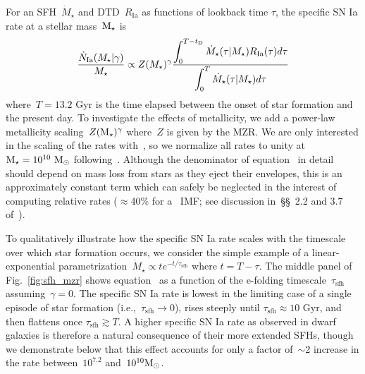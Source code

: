 \documentclass[foo.tex]{subfiles}
\begin{document}
For an SFH~$\dot{M}_\star$ and DTD~$R_\text{Ia}$ as functions of lookback time
$\tau$, the specific SN Ia rate at a stellar mass~$\text{M}_\star$ is
\begin{equation}
\frac{\dot{N}_\text{Ia}(M_\star | \gamma)}{M_\star} \propto Z(M_\star)^\gamma
\frac{\displaystyle{
	\int_0^{T - t_\text{D}}\dot{M}_\star(\tau | M_\star) R_\text{Ia}(\tau) d\tau
}}{\displaystyle{
	\int_0^T \dot{M}_\star(\tau | M_\star) d\tau
}}
\label{eq:specia}
\end{equation}
where~$T = 13.2$ Gyr is the time elapsed between the onset of star formation
and the present day.
To investigate the effects of metallicity, we add a power-law metallicity
scaling~$Z(\text{M}_\star)^\gamma$ where~$Z$ is given by the MZR.
We are only interested in the scaling of the rates with~\mstar, so we normalize
all rates to unity at~$\text{M}_\star = 10^{10}~\text{M}_\odot$ following~\citet{Brown2019}.
Although the denominator of equation~ in detail should depend
on mass loss from stars as they eject their envelopes, this is an approximately
constant term which can safely be neglected in the interest of computing
relative rates ($\approx$40\% for a~\citealt{Kroupa2001} IMF; see discussion
in~\S\S~2.2 and 3.7 of~\citealt*{Weinberg2017}).
\par
To qualitatively illustrate how the specific SN Ia rate scales with the
timescale over which star formation occurs, we consider the simple example of a
linear-exponential
parametrization~$\dot{M}_\star \propto te^{-t/\tau_\text{sfh}}$ where
$t = T - \tau$.
The middle panel of Fig.~\ref{fig:sfh_mzr} shows equation~ as
a function of the e-folding timescale~$\tau_\text{sfh}$ assuming~$\gamma = 0$.
The specific SN Ia rate is lowest in the limiting case of a single episode of
star formation (i.e.,~$\tau_\text{sfh} \rightarrow 0$), rises steeply until
$\tau_\text{sfh} \approx 10$ Gyr, and then flattens once
$\tau_\text{sfh} \gtrsim T$.
A higher specific SN Ia rate as observed in dwarf galaxies is therefore a
natural consequence of their more extended SFHs, though we demonstrate below
that this effect accounts for only a factor of~$\sim$2 increase in the rate
between~$10^{7.2}$ and~$10^{10} \text{M}_\odot$.
\end{document}
